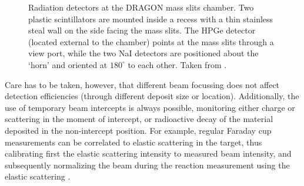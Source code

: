 \begin{figure}
\centering
{}
\caption{Radiation detectors at the DRAGON mass slits chamber. Two plastic scintillators are mounted inside a recess with a thin stainless steal wall on the side facing the mass slits. The HPGe detector (located external to the chamber) points at the mass slits through a view port, while the two NaI detectors are positioned about the `horn' and oriented at $180^\circ$ to each other. Taken from \cite{vock08}.}
\label{fig:xslitm}
\end{figure}
%
Care has to be taken, however, that different beam focussing does not affect detection efficiencies (through different deposit size or location). Additionally, the use of temporary beam intercepts is always possible, monitoring either charge or scattering in the moment of intercept, or radioactive decay of the material deposited in the non-intercept position. For example, regular Faraday cup measurements can be correlated to elastic scattering in the target, thus calibrating first the elastic scattering intensity to measured beam intensity, and subsequently normalizing the beam during the reaction measurement using the elastic scattering \cite{dau04}. 

